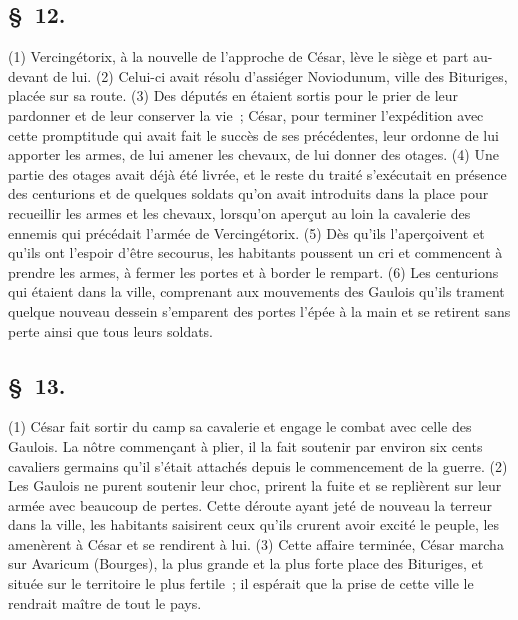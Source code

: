 \documentclass[french,twoside]{book} %
\begin{document}
\subsection[{§ 12.}]{ \textsc{§ 12.} }
\noindent (1) Vercingétorix, à la nouvelle de l’approche de César, lève le siège et part au-devant de lui. (2) Celui-ci avait résolu d’assiéger Noviodunum, ville des Bituriges, placée sur sa route. (3) Des députés en étaient sortis pour le prier de leur pardonner et de leur conserver la vie ; César, pour terminer l’expédition avec cette promptitude qui avait fait le succès de ses précédentes, leur ordonne de lui apporter les armes, de lui amener les chevaux, de lui donner des otages. (4) Une partie des otages avait déjà été livrée, et le reste du traité s’exécutait en présence des centurions et de quelques soldats qu’on avait introduits dans la place pour recueillir les armes et les chevaux, lorsqu’on aperçut au loin la cavalerie des ennemis qui précédait l’armée de Vercingétorix. (5) Dès qu’ils l’aperçoivent et qu’ils ont l’espoir d’être secourus, les habitants poussent un cri et commencent à prendre les armes, à fermer les portes et à border le rempart. (6) Les centurions qui étaient dans la ville, comprenant aux mouvements des Gaulois qu’ils trament quelque nouveau dessein s’emparent des portes l’épée à la main et se retirent sans perte ainsi que tous leurs soldats.
\subsection[{§ 13.}]{ \textsc{§ 13.} }
\noindent (1) César fait sortir du camp sa cavalerie et engage le combat avec celle des Gaulois. La nôtre commençant à plier, il la fait soutenir par environ six cents cavaliers germains qu’il s’était attachés depuis le commencement de la guerre. (2) Les Gaulois ne purent soutenir leur choc, prirent la fuite et se replièrent sur leur armée avec beaucoup de pertes. Cette déroute ayant jeté de nouveau la terreur dans la ville, les habitants saisirent ceux qu’ils crurent avoir excité le peuple, les amenèrent à César et se rendirent à lui. (3) Cette affaire terminée, César marcha sur Avaricum (Bourges), la plus grande et la plus forte place des Bituriges, et située sur le territoire le plus fertile ; il espérait que la prise de cette ville le rendrait maître de tout le pays.
\end{document}
